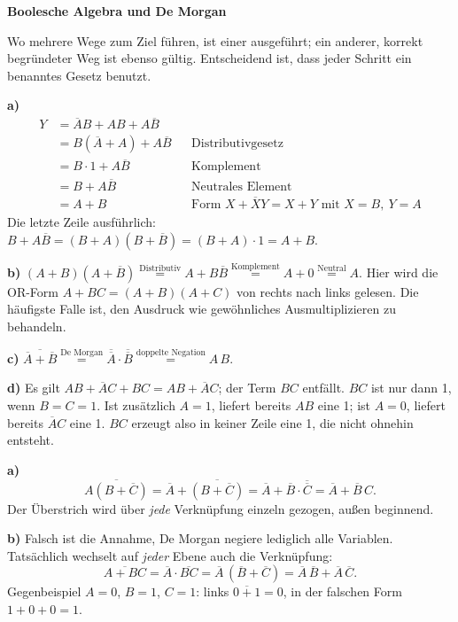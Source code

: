 \documentclass[10pt,a4paper]{article}
\newcommand{\titlepagepart}[2]{\vspace*{-4mm}{\sffamily\small #1}\par{\sffamily\LARGE\bfseries #2}\par\vspace{2mm}}
\newcommand{\block}[1]{\par\vspace{2mm}{\sffamily\large\bfseries #1}\par}
\begin{document}
\titlepagepart{01 / LÖSUNGEN ZU SEITE 1 UND 2}{Boolesche Algebra und De Morgan}
Wo mehrere Wege zum Ziel führen, ist einer ausgeführt; ein anderer, korrekt
begründeter Weg ist ebenso gültig. Entscheidend ist, dass jeder Schritt ein
benanntes Gesetz benutzt.

\block{1. Vereinfachen mit den Gesetzen}
\textbf{a)}
\begin{align*}
Y&=\overline{A}B+AB+A\overline{B}\\
 &=B(\overline{A}+A)+A\overline{B} &&\text{Distributivgesetz}\\
 &=B\cdot 1+A\overline{B} &&\text{Komplement}\\
 &=B+A\overline{B} &&\text{Neutrales Element}\\
 &=A+B &&\text{Form } X+\overline{X}Y=X+Y \text{ mit } X=B,\ Y=A
\end{align*}
Die letzte Zeile ausführlich: $B+A\overline{B}=(B+A)(B+\overline{B})=(B+A)\cdot 1=A+B$.

\textbf{b)}
$(A+B)(A+\overline{B})\overset{\text{Distributiv}}{=}A+B\overline{B}
\overset{\text{Komplement}}{=}A+0\overset{\text{Neutral}}{=}A.$
Hier wird die OR-Form $A+BC=(A+B)(A+C)$ von rechts nach links gelesen. Die
häufigste Falle ist, den Ausdruck wie gewöhnliches Ausmultiplizieren zu behandeln.

\textbf{c)}
$\overline{\overline{A}+\overline{B}}
\overset{\text{De Morgan}}{=}\overline{\overline{A}}\cdot\overline{\overline{B}}
\overset{\text{doppelte Negation}}{=}A\,B.$

\textbf{d)} Es gilt $AB+\overline{A}C+BC=AB+\overline{A}C$; der Term $BC$ entfällt.
$BC$ ist nur dann 1, wenn $B=C=1$. Ist zusätzlich $A=1$, liefert bereits $AB$
eine 1; ist $A=0$, liefert bereits $\overline{A}C$ eine 1. $BC$ erzeugt also in
keiner Zeile eine 1, die nicht ohnehin entsteht.

\block{2. De Morgan sicher anwenden}
\textbf{a)}
\[
\overline{A(B+\overline{C})}
=\overline{A}+\overline{(B+\overline{C})}
=\overline{A}+\overline{B}\cdot\overline{\overline{C}}
=\overline{A}+\overline{B}\,C .
\]
Der Überstrich wird über \emph{jede} Verknüpfung einzeln gezogen, außen beginnend.

\textbf{b)} Falsch ist die Annahme, De Morgan negiere lediglich alle Variablen.
Tatsächlich wechselt auf \emph{jeder} Ebene auch die Verknüpfung:
\[
\overline{A+BC}=\overline{A}\cdot\overline{BC}
=\overline{A}\,(\overline{B}+\overline{C})
=\overline{A}\,\overline{B}+\overline{A}\,\overline{C}.
\]
Gegenbeispiel $A=0$, $B=1$, $C=1$: links $\overline{0+1}=0$, in der falschen
Form $1+0+0=1$.
\end{document}
